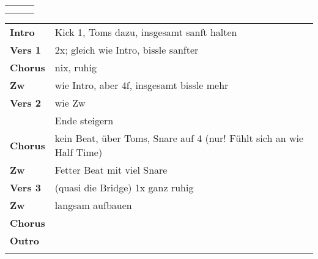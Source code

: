 

\begin{tabular}{p{0.6cm}p{12cm}p{1.4cm}}
	\rowcolor{cyan} \myRow{\thesongnumber} & \myRow{Cornerstone} & \myRow{72} \\
	                                       &                     &            \\
\end{tabular}

\begin{tabular}{p{1.6cm}l}
	\textbf{Intro}  & Kick 1, Toms dazu, insgesamt sanft halten                            \\
	\textbf{Vers 1} & 2x; gleich wie Intro, bissle sanfter                                 \\
	\textbf{Chorus} & nix, ruhig                                                           \\
	\textbf{Zw}     & wie Intro, aber 4f, insgesamt bissle mehr                            \\
	\textbf{Vers 2} & wie Zw                                                               \\
	                & Ende steigern                                                        \\
	\textbf{Chorus} & kein Beat, über Toms, Snare auf 4 (nur! Fühlt sich an wie Half Time) \\
	\textbf{Zw}     & Fetter Beat mit viel Snare                                           \\
	\textbf{Vers 3} & (quasi die Bridge) 1x ganz ruhig                                     \\
	\textbf{Zw}     & langsam aufbauen                                                     \\
	\textbf{Chorus} &                                                                      \\
	\textbf{Outro}  &                                                                      \\
	                &                                                                      \\
\end{tabular}
